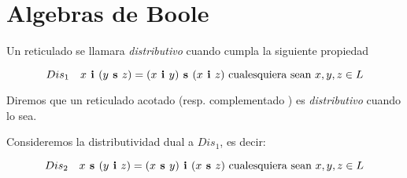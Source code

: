 
\section{Algebras de Boole}
\begin{definition}
  Un reticulado \reticulAlg se llamara \emph{distributivo} cuando cumpla la siguiente propiedad

  \begin{equation*}
    Dis_1\quad x\textbf{ i }(y\textbf{ s }z) = (x\textbf{ i }y)\textbf{ s }(x\textbf{ i }z) \text{ cualesquiera sean } x, y, z\in L
  \end{equation*}

  Diremos que un reticulado acotado \reticulAcot (resp. complementado \reticulCompl) es \emph{distributivo}
  cuando \reticulAlg lo sea.

  Consideremos la distributividad dual a $Dis_1$, es decir:

  \begin{equation*}
    Dis_2\quad x\textbf{ s }(y\textbf{ i }z) = (x\textbf{ s }y)\textbf{ i }(x\textbf{ s }z) \text{ cualesquiera sean } x, y, z\in L
  \end{equation*}
\end{definition}

